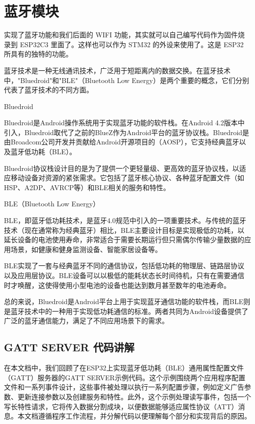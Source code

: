 \documentclass[lang=cn,newtx,10pt,scheme=chinese]{elegantbook}
\begin{document}
\chapter{蓝牙模块}

实现了蓝牙功能和我们后面的 WIFI 功能，其实就可以自己编写代码作为固件烧录到 ESP32C3 里面了。这样也可以作为 STM32 的外设来使用了。这是 ESP32 所具有的独特的功能。

蓝牙技术是一种无线通讯技术，广泛用于短距离内的数据交换。在蓝牙技术中，"Bluedroid"和"BLE"（Bluetooth Low Energy）是两个重要的概念，它们分别代表了蓝牙技术的不同方面。

Bluedroid

Bluedroid是Android操作系统用于实现蓝牙功能的软件栈。在Android 4.2版本中引入，Bluedroid取代了之前的BlueZ作为Android平台的蓝牙协议栈。Bluedroid是由Broadcom公司开发并贡献给Android开源项目的（AOSP），它支持经典蓝牙以及蓝牙低功耗（BLE）。

Bluedroid协议栈设计目的是为了提供一个更轻量级、更高效的蓝牙协议栈，以适应移动设备对资源的紧张需求。它包括了蓝牙核心协议、各种蓝牙配置文件（如HSP、A2DP、AVRCP等）和BLE相关的服务和特性。

BLE（Bluetooth Low Energy）

BLE，即蓝牙低功耗技术，是蓝牙4.0规范中引入的一项重要技术。与传统的蓝牙技术（现在通常称为经典蓝牙）相比，BLE主要设计目标是实现极低的功耗，以延长设备的电池使用寿命，非常适合于需要长期运行但只需偶尔传输少量数据的应用场景，如健康和健身监测设备、智能家居设备等。

BLE实现了一套与经典蓝牙不同的通信协议，包括低功耗的物理层、链路层协议以及应用层协议。BLE设备可以以极低的能耗状态长时间待机，只有在需要通信时才唤醒，这使得使用小型电池的设备也能达到数月甚至数年的电池寿命。

总的来说，Bluedroid是Android平台上用于实现蓝牙通信功能的软件栈，而BLE则是蓝牙技术中的一种用于实现低功耗通信的标准。两者共同为Android设备提供了广泛的蓝牙通信能力，满足了不同应用场景下的需求。

\section{GATT SERVER 代码讲解}

在本文档中，我们回顾了在ESP32上实现蓝牙低功耗（BLE）通用属性配置文件（GATT）服务器的GATT SERVER示例代码。这个示例围绕两个应用程序配置文件和一系列事件设计，这些事件被处理以执行一系列配置步骤，例如定义广告参数、更新连接参数以及创建服务和特性。此外，这个示例处理读写事件，包括一个写长特性请求，它将传入数据分割成块，以便数据能够适应属性协议（ATT）消息。本文档遵循程序工作流程，并分解代码以便理解每个部分和实现背后的原因。
\end{document}
